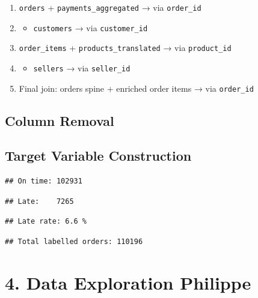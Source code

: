 \documentclass[
]{article}
\providecommand{\tightlist}{%
  \setlength{\itemsep}{0pt}\setlength{\parskip}{0pt}}
\begin{document}
\begin{enumerate}
\def\labelenumi{\arabic{enumi}.}
\tightlist
\item
  \texttt{orders} + \texttt{payments\_aggregated} → via
  \texttt{order\_id}
\item
  \begin{itemize}
  \tightlist
  \item
    \texttt{customers} → via \texttt{customer\_id}
  \end{itemize}
\item
  \texttt{order\_items} + \texttt{products\_translated} → via
  \texttt{product\_id}
\item
  \begin{itemize}
  \tightlist
  \item
    \texttt{sellers} → via \texttt{seller\_id}
  \end{itemize}
\item
  Final join: orders spine + enriched order items → via
  \texttt{order\_id}
\end{enumerate}

\subsection{Column Removal}\label{column-removal}

\subsection{Target Variable
Construction}\label{target-variable-construction}

\begin{verbatim}
## On time: 102931
\end{verbatim}

\begin{verbatim}
## Late:    7265
\end{verbatim}

\begin{verbatim}
## Late rate: 6.6 %
\end{verbatim}

\begin{verbatim}
## Total labelled orders: 110196
\end{verbatim}

\section{4. Data Exploration Philippe}\label{data-exploration-philippe}
\end{document}
